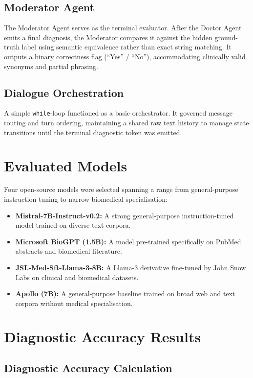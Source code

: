 \subsection{Moderator Agent}
The Moderator Agent serves as the terminal evaluator. After the Doctor Agent emits a final diagnosis, the Moderator compares it against the hidden ground-truth label using semantic equivalence rather than exact string matching. It outputs a binary correctness flag (``Yes'' / ``No''), accommodating clinically valid synonyms and partial phrasing.

\subsection{Dialogue Orchestration}
A simple \texttt{while}-loop functioned as a basic orchestrator. It governed message routing and turn ordering, maintaining a shared raw text history to manage state transitions until the terminal diagnostic token was emitted.

\section{Evaluated Models}

Four open-source models were selected spanning a range from general-purpose instruction-tuning to narrow biomedical specialisation:
\begin{itemize}
    \item \textbf{Mistral-7B-Instruct-v0.2:} A strong general-purpose instruction-tuned model trained on diverse text corpora.
    \item \textbf{Microsoft BioGPT (1.5B):} A model pre-trained specifically on PubMed abstracts and biomedical literature.
    \item \textbf{JSL-Med-Sft-Llama-3-8B:} A Llama-3 derivative fine-tuned by John Snow Labs on clinical and biomedical datasets.
    \item \textbf{Apollo (7B):} A general-purpose baseline trained on broad web and text corpora without medical specialisation.
\end{itemize}

\section{Diagnostic Accuracy Results}

\subsection{Diagnostic Accuracy Calculation}


